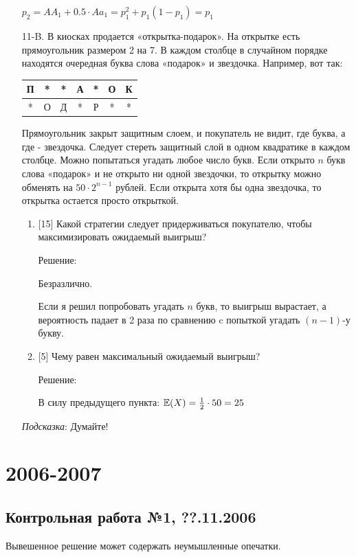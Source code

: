 \documentclass[12pt, a4paper]{article}\usepackage[]{graphicx}\usepackage[]{color}
\begin{document}
\begin{enumerate}
$p_{2}=AA_{1}+0.5\cdot Aa_{1}=p_{1}^{2}+p_{1}(1-p_{1})=p_{1}$


\item[11-B.] В киосках продается «открытка-подарок». На открытке есть
прямоугольник размером 2 на 7. В каждом столбце в случайном
порядке находятся очередная буква слова «подарок» и звездочка.
Например, вот так:

\begin{tabular}{|c|c|c|c|c|c|c|}
  \hline
  П & * & * & А & * & О & К \\
  \hline
  * & О & Д & * & Р & * & * \\
  \hline
\end{tabular}

Прямоугольник закрыт защитным слоем, и покупатель не видит, где
буква, а где - звездочка. Следует стереть защитный слой в одном
квадратике в каждом столбце. Можно попытаться угадать любое число
букв. Если открыто $n$ букв слова «подарок» и не открыто ни одной
звездочки, то открытку можно обменять на $50\cdot 2^{n-1}$ рублей.
Если открыта хотя бы одна звездочка, то открытка
остается просто открыткой.
\begin{enumerate}
\item{} [15] Какой стратегии следует придерживаться покупателю, чтобы
максимизировать ожидаемый выигрыш?

Решение:

Безразлично.

Если я решил попробовать угадать $n$ букв, то выигрыш вырастает, а
вероятность падает в 2 раза по сравнению c попыткой угадать $(n-1)$-у букву.
\item{} [5] Чему равен максимальный ожидаемый выигрыш?

Решение:

В силу предыдущего пункта: $\mathbb{E}(X)=\frac{1}{2}\cdot 50=25$
\end{enumerate}
\emph{Подсказка}: Думайте!
\end{enumerate}


\section{2006-2007}

\subsection{Контрольная работа №1, ??.11.2006}

Вывешенное решение может содержать неумышленные опечатки.
\end{document}
